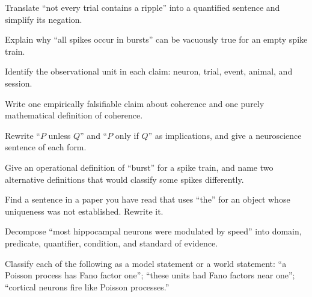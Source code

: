 \begin{exercises}
\item Translate ``not every trial contains a ripple'' into a quantified sentence and simplify its negation.
\item Explain why ``all spikes occur in bursts'' can be vacuously true for an empty spike train.
\item Identify the observational unit in each claim: neuron, trial, event, animal, and session.
\item Write one empirically falsifiable claim about coherence and one purely mathematical definition of coherence.
\item Rewrite ``$P$ unless $Q$'' and ``$P$ only if $Q$'' as implications, and give a neuroscience sentence of each form.
\item Give an operational definition of ``burst'' for a spike train, and name two alternative definitions that would classify some spikes differently.
\item Find a sentence in a paper you have read that uses ``the'' for an object whose uniqueness was not established. Rewrite it.
\item Decompose ``most hippocampal neurons were modulated by speed'' into domain, predicate, quantifier, condition, and standard of evidence.
\item Classify each of the following as a model statement or a world statement: ``a Poisson process has Fano factor one''; ``these units had Fano factors near one''; ``cortical neurons fire like Poisson processes.''
\end{exercises}
